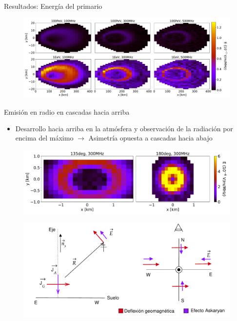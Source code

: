 \documentclass{beamer}
\begin{document}
\begin{frame}{Resultados: Energía del primario}
		\begin{figure}[H]
		\centering
		\includegraphics[width=1\linewidth]{figures/Radio_UG/85deg_varE}

	\end{figure}
\end{frame}
	\begin{frame}{Emisión en radio en cascadas hacia arriba}
	\begin{itemize}
		\item Desarrollo hacia arriba en la atmósfera y observación de la radiación por encima del máximo $\rightarrow$ Asimetría opuesta a cascadas hacia abajo
	\end{itemize}
	\begin{figure}[H]
		\centering
		\includegraphics[width=.75\linewidth]{figures/Radio_UG/Comparativa_0_45deg}
	\end{figure}
	\begin{figure}[H]
		\centering
		\includegraphics[width=.65\linewidth]{figures/Radio_UG/Polarizacion_UG}
	\end{figure}
	
\end{frame}
\end{document}
